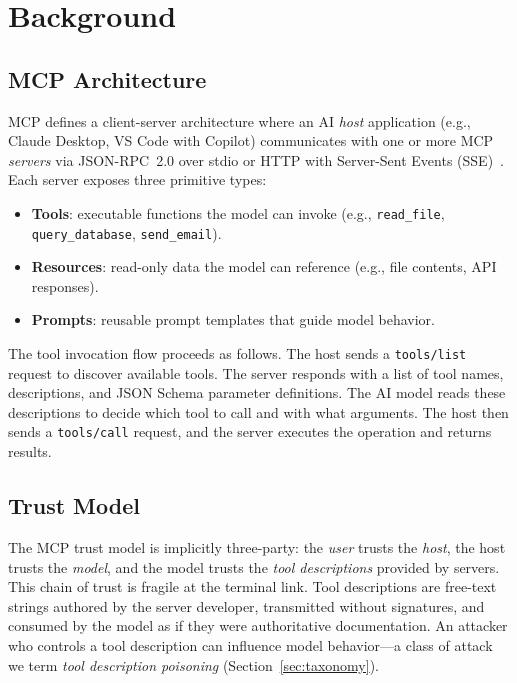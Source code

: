 \documentclass[11pt,twocolumn]{article}
\begin{document}
\section{Background}
\label{sec:background}

\subsection{MCP Architecture}

MCP defines a client-server architecture where an AI \emph{host} application (e.g., Claude Desktop, VS Code with Copilot) communicates with one or more MCP \emph{servers} via JSON-RPC~2.0 over stdio or HTTP with Server-Sent Events (SSE)~\cite{mcp-spec}. Each server exposes three primitive types:

\begin{itemize}[leftmargin=*]
    \item \textbf{Tools}: executable functions the model can invoke (e.g., \texttt{read\_file}, \texttt{query\_database}, \texttt{send\_email}).
    \item \textbf{Resources}: read-only data the model can reference (e.g., file contents, API responses).
    \item \textbf{Prompts}: reusable prompt templates that guide model behavior.
\end{itemize}

The tool invocation flow proceeds as follows. The host sends a \texttt{tools/list} request to discover available tools. The server responds with a list of tool names, descriptions, and JSON Schema parameter definitions. The AI model reads these descriptions to decide which tool to call and with what arguments. The host then sends a \texttt{tools/call} request, and the server executes the operation and returns results.

\subsection{Trust Model}

The MCP trust model is implicitly three-party: the \emph{user} trusts the \emph{host}, the host trusts the \emph{model}, and the model trusts the \emph{tool descriptions} provided by servers. This chain of trust is fragile at the terminal link. Tool descriptions are free-text strings authored by the server developer, transmitted without signatures, and consumed by the model as if they were authoritative documentation. An attacker who controls a tool description can influence model behavior---a class of attack we term \emph{tool description poisoning} (Section~\ref{sec:taxonomy}).
\end{document}
